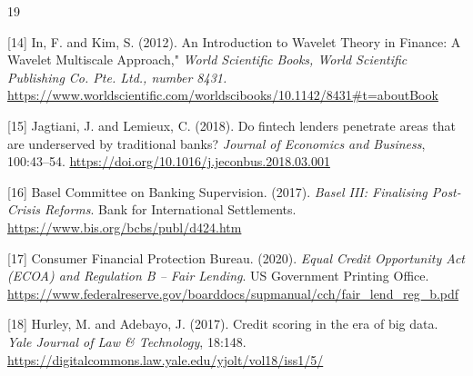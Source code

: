 \documentclass[a4 paper, 11pt,twoside]{article}
\newcommand{\0}{\Bf{0}}
\theoremstyle{definition}
\begin{document}
{\begin{thebibliography}{19}
{\label{ref14}[14] In, F. and Kim, S. (2012). An Introduction to Wavelet Theory in Finance: A Wavelet Multiscale Approach,"  \emph{World Scientific Books, World Scientific Publishing Co. Pte. Ltd., number 8431.}
\url{https://www.worldscientific.com/worldscibooks/10.1142/8431#t=aboutBook}

\label{ref15}[15] Jagtiani, J. and Lemieux, C. (2018). Do fintech lenders penetrate areas that are underserved by traditional banks? \emph{Journal of Economics and Business}, 100:43--54. \url{https://doi.org/10.1016/j.jeconbus.2018.03.001}

\label{ref17}[16] Basel Committee on Banking Supervision. (2017). \emph{Basel III: Finalising Post-Crisis Reforms}. Bank for International Settlements. \url{https://www.bis.org/bcbs/publ/d424.htm}

\label{ref18}[17] Consumer Financial Protection Bureau. (2020). \emph{Equal Credit Opportunity Act (ECOA) and Regulation B -- Fair Lending}. US Government Printing Office. \url{https://www.federalreserve.gov/boarddocs/supmanual/cch/fair_lend_reg_b.pdf}

\label{ref19}[18] Hurley, M. and Adebayo, J. (2017). Credit scoring in the era of big data. \emph{Yale Journal of Law \& Technology}, 18:148. \url{https://digitalcommons.law.yale.edu/yjolt/vol18/iss1/5/}
}\end{thebibliography}
}
\end{document}
